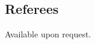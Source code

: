 \documentclass[margin,line]{resume}
\begin{document}
\begin{resume}
\section{\mysidestyle Referees} 

Available upon request.
%



\end{resume}
\end{document}
